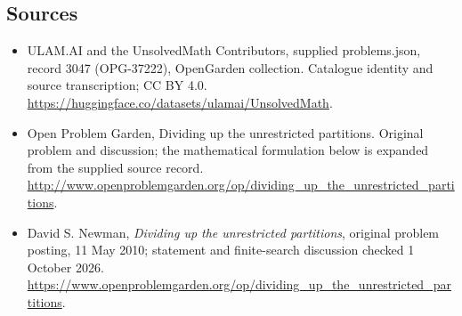 \documentclass[11pt,a4paper]{article}
\begin{document}
\subsection{Sources}
\begin{itemize}
\item[S1] ULAM.AI and the UnsolvedMath Contributors, supplied problems.json, record 3047 (OPG-37222), OpenGarden collection. Catalogue identity and source transcription; CC BY 4.0.
\url{https://huggingface.co/datasets/ulamai/UnsolvedMath}.
\item[S2] Open Problem Garden, Dividing up the unrestricted partitions. Original problem and discussion; the mathematical formulation below is expanded from the supplied source record.
\url{http://www.openproblemgarden.org/op/dividing_up_the_unrestricted_partitions}.

\item[R1] David S. Newman, \emph{Dividing up the unrestricted
partitions}, original problem posting, 11 May 2010; statement and
finite-search discussion checked 1 October 2026.
\url{https://www.openproblemgarden.org/op/dividing_up_the_unrestricted_partitions}.

\end{itemize}
\end{document}
